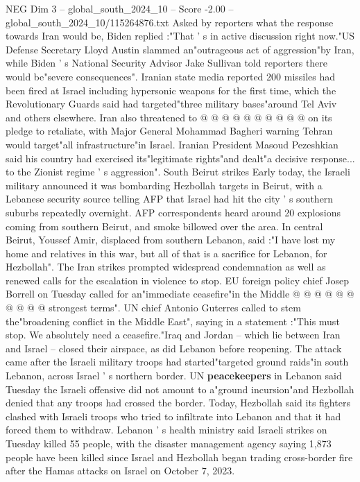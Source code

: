 \begin{textsample}{NEG Dim 3 – global\_south\_2024\_10 – Score -2.00 – global\_south\_2024\_10/115264876.txt}
Asked by reporters what the response towards Iran would be, Biden replied :"That ' s in active discussion right now."US Defense Secretary Lloyd Austin slammed an"outrageous act of aggression"by Iran, while Biden ' s National Security Advisor Jake Sullivan told reporters there would be"severe consequences".
Iranian state media reported 200 missiles had been fired at Israel including hypersonic weapons for the first time, which the Revolutionary Guards said had targeted"three military bases"around Tel Aviv and others elsewhere.
Iran also threatened to @ @ @ @ @ @ @ @ @ @ on its pledge to retaliate, with Major General Mohammad Bagheri warning Tehran would target"all infrastructure"in Israel.
Iranian President Masoud Pezeshkian said his country had exercised its"legitimate rights"and dealt"a decisive response... to the Zionist regime ' s aggression".
South Beirut strikes Early today, the Israeli military announced it was bombarding Hezbollah targets in Beirut, with a Lebanese security source telling AFP that Israel had hit the city ' s southern suburbs repeatedly overnight.
AFP correspondents heard around 20 explosions coming from southern Beirut, and smoke billowed over the area.
In central Beirut, Youssef Amir, displaced from southern Lebanon, said :"I have lost my home and relatives in this war, but all of that is a sacrifice for Lebanon, for Hezbollah".
The Iran strikes prompted widespread condemnation as well as renewed calls for the escalation in violence to stop.
EU foreign policy chief Josep Borrell on Tuesday called for an"immediate ceasefire"in the Middle @ @ @ @ @ @ @ @ @ @ strongest terms".
UN chief Antonio Guterres called to stem the"broadening conflict in the Middle East", saying in a statement :"This must stop.
We absolutely need a ceasefire."Iraq and Jordan -- which lie between Iran and Israel -- closed their airspace, as did Lebanon before reopening.
The attack came after the Israeli military troops had started"targeted ground raids"in south Lebanon, across Israel ' s northern border.
UN \textbf{peacekeepers} in Lebanon said Tuesday the Israeli offensive did not amount to a"ground incursion"and Hezbollah denied that any troops had crossed the border.
Today, Hezbollah said its fighters clashed with Israeli troops who tried to infiltrate into Lebanon and that it had forced them to withdraw.
Lebanon ' s health ministry said Israeli strikes on Tuesday killed 55 people, with the disaster management agency saying 1,873 people have been killed since Israel and Hezbollah began trading cross-border fire after the Hamas attacks on Israel on October 7, 2023.

\end{textsample}
